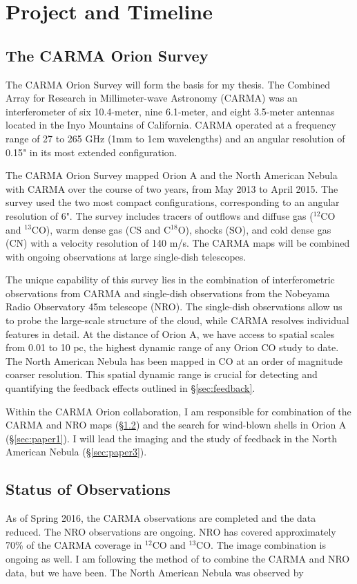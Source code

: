 \section{Project and Timeline}\label{sec:project}
    \subsection{The CARMA Orion Survey}\label{sec:carma}
    The CARMA Orion Survey will form the basis for my thesis. The Combined Array for Research in Millimeter-wave Astronomy (CARMA) was an interferometer of six 10.4-meter, nine 6.1-meter, and eight 3.5-meter antennas located in the Inyo Mountains of California. CARMA operated at a frequency range of 27 to 265 GHz (1mm to 1cm wavelengths) and an angular resolution of 0.15" in its most extended configuration.
    
    The CARMA Orion Survey mapped Orion A and the North American Nebula with CARMA over the course of two years, from May 2013 to April 2015. The survey used the two most compact configurations, corresponding to an angular resolution of 6". The survey includes tracers of outflows and diffuse gas ($^12$CO and $^13$CO), warm dense gas (CS and C$^18$O), shocks (SO), and cold dense gas (CN) with a velocity resolution of 140 m/s. The CARMA maps will be combined with ongoing observations at large single-dish telescopes. %
    
    The unique capability of this survey lies in the combination of interferometric observations from CARMA and single-dish observations from the Nobeyama Radio Observatory 45m telescope (NRO). The single-dish observations allow us to probe the large-scale structure of the cloud, while CARMA resolves individual features in detail. At the distance of Orion A, we have access to spatial scales from 0.01 to 10 pc, the highest dynamic range of any Orion CO study to date. The North American Nebula has been mapped in CO at an order of magnitude coarser resolution. This spatial dynamic range is crucial for detecting and quantifying the feedback effects outlined in \S\ref{sec:feedback}.
    
Within the CARMA Orion collaboration, I am responsible for combination of the CARMA and NRO maps (\S\ref{sec:status}) and the search for wind-blown shells in Orion A (\S\ref{sec:paper1}). I will lead the imaging and the study of feedback in the North American Nebula (\S\ref{sec:paper3}). 

    \subsection{Status of Observations}\label{sec:status}
    As of Spring 2016, the CARMA observations are completed and the data reduced. The NRO observations are ongoing. NRO has covered approximately 70\% of the CARMA coverage in $^{12}$CO and $^{13}$CO. The image combination is ongoing as well. I am following the method of \citet{Koda11} to combine the CARMA and NRO data, but we have been. The North American Nebula was observed by 
    
